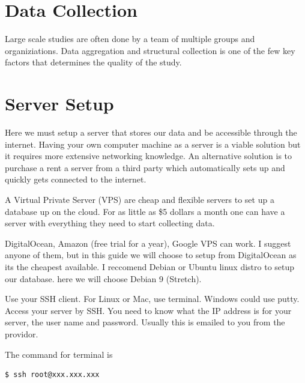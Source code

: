 \documentclass{ou-thesis}
\begin{document}
\begin{appendix}
\section*{Data Collection}


\indent Large scale studies are often done by a team of multiple groups and organiziations. Data aggregation and structural collection is one of the few key factors that determines the quality of the study.

\section*{Server Setup}

\indent Here we must setup a server that stores our data and be accessible through the internet. Having your own computer machine as a server is a viable solution but it requires more extensive networking knowledge. An alternative solution is to purchase a rent a server from a third party which automatically sets up and quickly gets connected to the internet.

A Virtual Private Server (VPS) are cheap and flexible servers to set up a database up on the cloud. For as little as \$5 dollars a month one can have a server with everything they need to start collecting data.

DigitalOcean, Amazon (free trial for a year), Google VPS can work. I suggest anyone of them, but in this guide we will choose to setup from DigitalOcean as its the cheapest available. I reccomend Debian or Ubuntu linux distro to setup our database. here we will choose Debian 9 (Stretch).

Use your SSH client. For Linux or Mac, use terminal. Windows could use putty. Access your server by SSH. You need to know what the IP address is for your server, the user name and password. Usually this is emailed to you from the providor.

\noindent The command for terminal is

\begin{lstlisting}[language=bash]
  $ ssh root@xxx.xxx.xxx
\end{lstlisting}



\end{appendix}
\end{document}
